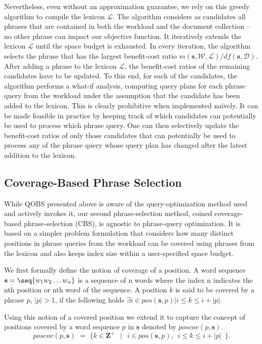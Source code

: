 Nevertheless, even without an approximation guarantee, we rely on this
greedy algorithm to compile the lexicon $\mathcal{L}$. The
algorithm considers as candidates all phrases that are contained in
both the workload and the document collection -- no other phrase can
impact our objective function. It iteratively extends the lexicon
$\mathcal{L}$ until the space budget is exhausted. In every iteration,
the algorithm selects the phrase that has the largest benefit-cost
ratio
$m(\mathbf{s},\mathcal{W},\mathcal{L}) / df(\mathbf{s}, \mathcal{D})$.
After adding a phrase to the lexicon $\mathcal{L}$, the
benefit-cost ratios of the remaining candidates have to be updated. To
this end, for each of the candidates, the algorithm performs a what-if
analysis, computing query plans for each phrase query from the
workload under the assumption that the candidate has been added to the
lexicon. This is clearly prohibitive when implemented na\"ively. It
can be made feasible in practice by keeping track of which candidates
can potentially be used to process which phrase query. One can then
selectively update the benefit-cost ratios of only those candidates
that can potentially be used to process any of the phrase query whose
query plan has changed after the latest addition to the lexicon.

\subsection{Coverage-Based Phrase Selection}
\label{subsec:cbs}

While QOBS presented above is aware of the query-optimization method
used and actively invokes it, our second phrase-selection method,
coined coverage-based phrase-selection (CBS), is agnostic to
phrase-query optimization. It is based on a simpler problem
formulation that considers how many distinct positions in phrase
queries from the workload can be covered using phrases from the
lexicon and also keeps index size within a user-specified space
budget.

We first formally define the notion of coverage of a position. A word sequence $\mathbf{s} = \seq{w_1 w_2 \ldots w_n}$ is a sequence of n words where the index n indicates the nth position or nth word of the sequence. A position $k$ is said to be covered by a phrase $p$, $|p| > 1$, if the following holds $\exists i \in pos(\mathbf{s}, p) | i \leq k \leq i+|p|.$

Using this notion of a covered position we extend it to capture the concept of positions covered by a word sequence $p$ in $\mathbf{s}$ denoted by $poscov(p, \mathbf{s})$. 
$$
  poscov(p, \mathbf{s}) \,\,=\,\, \{ k \in \mathbf{Z}^+ \,\,\,~|~ \,\,\, i \in pos(\mathbf{s}, p), \,\,\,i \leq k \leq i+|p| \,\,\,\}.
$$ 

